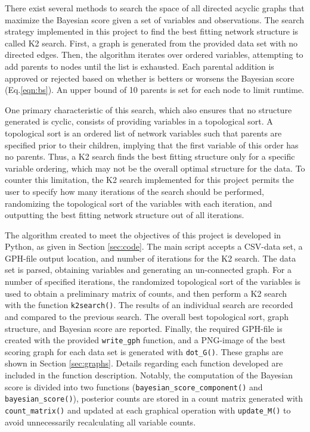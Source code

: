\documentclass[twoside,11pt]{article}
\begin{document}
There exist several methods to search the space of all directed acyclic graphs that maximize the Bayesian score given a set of variables and observations. The search strategy implemented in this project to find the best fitting network structure is called K2 search. First, a graph is generated from the provided data set with no directed edges. Then, the algorithm iterates over ordered variables, attempting to add parents to nodes until the list is exhausted. Each parental addition is approved or rejected based on whether is betters or worsens the Bayesian score (Eq.\ref{eqn:bs}). An upper bound of 10 parents is set for each node to limit runtime.

One primary characteristic of this search, which also ensures that no structure generated is cyclic, consists of providing variables in a topological sort. A topological sort is an ordered list of network variables such that parents are specified prior to their children, implying that the first variable of this order has no parents. Thus, a K2 search finds the best fitting structure only for a specific variable ordering, which may not be the overall optimal structure for the data. To counter this limitation, the K2 search implemented for this project permits the user to specify how many iterations of the search should be performed, randomizing the topological sort of the variables with each iteration, and outputting the best fitting network structure out of all iterations. 

The algorithm created to meet the objectives of this project is developed in Python, as given in Section \ref{sec:code}. The main script accepts a CSV-data set, a GPH-file output location, and number of iterations for the K2 search. The data set is parsed, obtaining variables and generating an un-connected graph. For a number of specified iterations, the randomized topological sort of the variables is used to obtain a preliminary matrix of counts, and then perform a K2 search with the function \texttt{k2search()}. The results of an individual search are recorded and compared to the previous search. The overall best topological sort, graph structure, and Bayesian score are reported. Finally, the required GPH-file is created with the provided \texttt{write\_gph} function, and a PNG-image of the best scoring graph for each data set is generated with \texttt{dot\_G()}. These graphs are shown in Section \ref{sec:graphs}. Details regarding each function developed are included in the function description. Notably, the computation of the Bayesian score is divided into two functions (\texttt{bayesian\_score\_component()} and \texttt{bayesian\_score()}), posterior counts are stored in a count matrix generated with \texttt{count\_matrix()} and updated at each graphical operation with \texttt{update\_M()} to avoid unnecessarily recalculating all variable counts.
\end{document}

